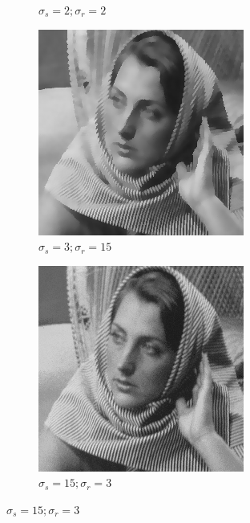 \documentclass[12pt]{article}
\begin{document}
\begin{figure}[h]
\begin{subfigure}[b]{0.24\textwidth}
        \caption{$\sigma_s=2;\sigma_r=2$}
        \label{fig:subfig2}
    \end{subfigure}
    \begin{subfigure}[b]{0.24\textwidth}
        \centering
        \includegraphics[width=\textwidth]{../images/filtered_barbara256_meanshift_sigma_s_3_sigma_r_15.png}
        \caption{$\sigma_s=3;\sigma_r=15$}
        \label{fig:subfig3}
    \end{subfigure}
    \begin{subfigure}[b]{0.24\textwidth}
        \centering
        \includegraphics[width=\textwidth]{../images/filtered_barbara256_meanshift_sigma_s_15_sigma_r_3.png}
        \caption{$\sigma_s=15;\sigma_r=3$}
        \label{fig:subfig3}
    \end{subfigure}
    

\end{figure}
\end{document}
